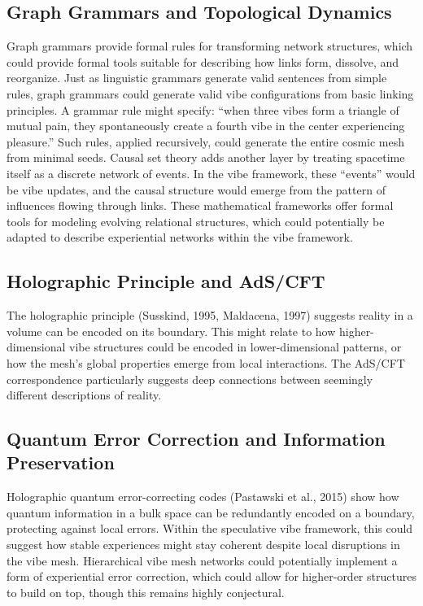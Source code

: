 \subsection{Graph Grammars and Topological Dynamics}

Graph grammars provide formal rules for transforming network structures, which could provide formal tools suitable for describing how links form, dissolve, and reorganize. Just as linguistic grammars generate valid sentences from simple rules, graph grammars could generate valid vibe configurations from basic linking principles. A grammar rule might specify: ``when three vibes form a triangle of mutual pain, they spontaneously create a fourth vibe in the center experiencing pleasure.'' Such rules, applied recursively, could generate the entire cosmic mesh from minimal seeds. Causal set theory adds another layer by treating spacetime itself as a discrete network of events. In the vibe framework, these ``events'' would be vibe updates, and the causal structure would emerge from the pattern of influences flowing through links. These mathematical frameworks offer formal tools for modeling evolving relational structures, which could potentially be adapted to describe experiential networks within the vibe framework.

\subsection{Holographic Principle and AdS/CFT}

The holographic principle (Susskind, 1995, Maldacena, 1997) suggests reality in a volume can be encoded on its boundary. This might relate to how higher-dimensional vibe structures could be encoded in lower-dimensional patterns, or how the mesh's global properties emerge from local interactions. The AdS/CFT correspondence particularly suggests deep connections between seemingly different descriptions of reality.

\subsection{Quantum Error Correction and Information Preservation}

Holographic quantum error-correcting codes (Pastawski et al., 2015) show how quantum information in a bulk space can be redundantly encoded on a boundary, protecting against local errors. Within the speculative vibe framework, this could suggest how stable experiences might stay coherent despite local disruptions in the vibe mesh. Hierarchical vibe mesh networks could potentially implement a form of experiential error correction, which could allow for higher-order structures to build on top, though this remains highly conjectural.

